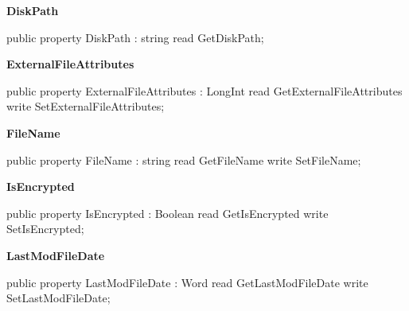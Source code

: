 \documentclass{report}
\newif\ifpdf
\begin{document}
\begin{list}{}
\begin{flushleft}
\ifpdf
\end{flushleft}
\fi


\par  \label{AbArcTyp.TAbArchiveItem-DiskPath}
\item[\textbf{DiskPath}\hfill]
\ifpdf
\begin{flushleft}
\fi
\begin{ttfamily}
public property DiskPath : string
      read GetDiskPath;\end{ttfamily}

\ifpdf
\end{flushleft}
\fi


\par  \label{AbArcTyp.TAbArchiveItem-ExternalFileAttributes}
\item[\textbf{ExternalFileAttributes}\hfill]
\ifpdf
\begin{flushleft}
\fi
\begin{ttfamily}
public property ExternalFileAttributes : LongInt
      read GetExternalFileAttributes
      write SetExternalFileAttributes;\end{ttfamily}

\ifpdf
\end{flushleft}
\fi


\par  \label{AbArcTyp.TAbArchiveItem-FileName}
\item[\textbf{FileName}\hfill]
\ifpdf
\begin{flushleft}
\fi
\begin{ttfamily}
public property FileName : string
      read GetFileName
      write SetFileName;\end{ttfamily}

\ifpdf
\end{flushleft}
\fi


\par  \label{AbArcTyp.TAbArchiveItem-IsEncrypted}
\item[\textbf{IsEncrypted}\hfill]
\ifpdf
\begin{flushleft}
\fi
\begin{ttfamily}
public property IsEncrypted : Boolean
      read GetIsEncrypted
      write SetIsEncrypted;\end{ttfamily}

\ifpdf
\end{flushleft}
\fi


\par  \label{AbArcTyp.TAbArchiveItem-LastModFileDate}
\item[\textbf{LastModFileDate}\hfill]
\ifpdf
\begin{flushleft}
\fi
\begin{ttfamily}
public property LastModFileDate : Word
      read GetLastModFileDate
      write SetLastModFileDate;\end{ttfamily}


\end{flushleft}
\end{list}
\end{document}
